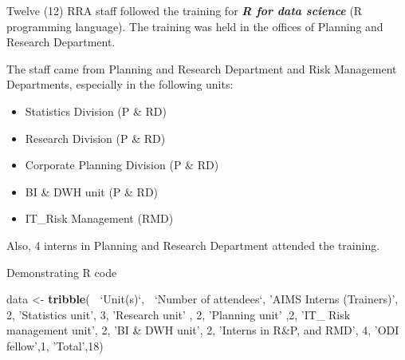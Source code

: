 \documentclass[ignorenonframetext,]{beamer}
\newenvironment{Shaded}{\begin{snugshade}}{\end{snugshade}}
\newcommand{\KeywordTok}[1]{\textcolor[rgb]{0.13,0.29,0.53}{\textbf{#1}}}
\newcommand{\DataTypeTok}[1]{\textcolor[rgb]{0.13,0.29,0.53}{#1}}
\newcommand{\DecValTok}[1]{\textcolor[rgb]{0.00,0.00,0.81}{#1}}
\newcommand{\StringTok}[1]{\textcolor[rgb]{0.31,0.60,0.02}{#1}}
\newcommand{\OperatorTok}[1]{\textcolor[rgb]{0.81,0.36,0.00}{\textbf{#1}}}
\newcommand{\NormalTok}[1]{#1}
\providecommand{\tightlist}{%
  \setlength{\itemsep}{0pt}\setlength{\parskip}{0pt}}
\begin{document}
\begin{frame}

Twelve (12) RRA staff followed the training for
\textit{\textbf{R for data science}} (R programming language). The
training was held in the offices of Planning and Research Department.

The staff came from Planning and Research Department and Risk Management
Departments, especially in the following units:

\begin{itemize}
\tightlist
\item
  Statistics Division (P \& RD)
\item
  Research Division (P \& RD)
\item
  Corporate Planning Division (P \& RD)
\item
  BI \& DWH unit (P \& RD)
\item
  IT\_Risk Management (RMD)
\end{itemize}

Also, 4 interns in Planning and Research Department attended the
training.

\end{frame}

\begin{frame}[fragile]{Demonstrating R code}

\begin{Shaded}
\begin{Highlighting}[]
\NormalTok{data <-}\StringTok{ }\KeywordTok{tribble}\NormalTok{(}
  \OperatorTok{~}\StringTok{`}\DataTypeTok{Unit(s)}\StringTok{`}\NormalTok{,}\OperatorTok{~}\StringTok{  `}\DataTypeTok{Number of attendees}\StringTok{`}\NormalTok{,}
\StringTok{'AIMS Interns (Trainers)'}\NormalTok{, }\DecValTok{2}\NormalTok{,}
\StringTok{'Statistics unit'}\NormalTok{, }\DecValTok{3}\NormalTok{,}
\StringTok{'Research unit'}\NormalTok{ , }\DecValTok{2}\NormalTok{,}
\StringTok{'Planning unit'}\NormalTok{ ,}\DecValTok{2}\NormalTok{,}
\StringTok{'IT_ Risk management unit'}\NormalTok{, }\DecValTok{2}\NormalTok{,}
\StringTok{'BI & DWH unit'}\NormalTok{,    }\DecValTok{2}\NormalTok{,}
\StringTok{'Interns in R&P, and RMD'}\NormalTok{, }\DecValTok{4}\NormalTok{,}
\StringTok{'ODI fellow'}\NormalTok{,}\DecValTok{1}\NormalTok{,}
\StringTok{'Total'}\NormalTok{,}\DecValTok{18}\NormalTok{)}
\end{Highlighting}
\end{Shaded}

\end{frame}
\end{document}

